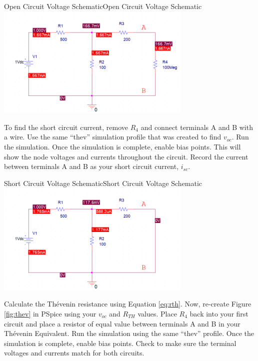 \documentclass[12pt]{../manual}
\begin{document}
\begin{myfigure}[colback=white,label=fig:openCircuit]{Open Circuit Voltage Schematic}{Open Circuit Voltage Schematic}
\centering
\includegraphics[width=0.7\textwidth]{figures/OpenCircuitSchematicCrop.PNG}
\end{myfigure}

To find the short circuit current, remove $R_4$ and connect terminals A and B with a wire.
Use the same ``thev'' simulation profile that was created to find $v_{oc}$. Run the simulation. Once the simulation is complete, enable bias points. This will show the node voltages and currents throughout the circuit. Record the current between terminals A and B as your short circuit current, $i_{sc}$.

\begin{myfigure}[colback=white,label=fig:shortCircuit]{Short Circuit Voltage Schematic}{Short Circuit Voltage Schematic}
\centering
\includegraphics[width=0.7\textwidth]{figures/ShortCircuitSchematicCrop.PNG}
\end{myfigure}

Calculate the Th\'evenin resistance using Equation \ref{eq:rth}. Now, re-create Figure \ref{fig:thev} in PSpice using your $v_{oc}$ and $R_{TH}$ values. Place $R_4$ back into your first circuit and place a resistor of equal value between terminals A and B in your Th\'evenin Equivalent. Run the simulation using the same ``thev'' profile. Once the simulation is complete, enable bias points. Check to make sure the terminal voltages and currents match for both circuits.
\end{document}
